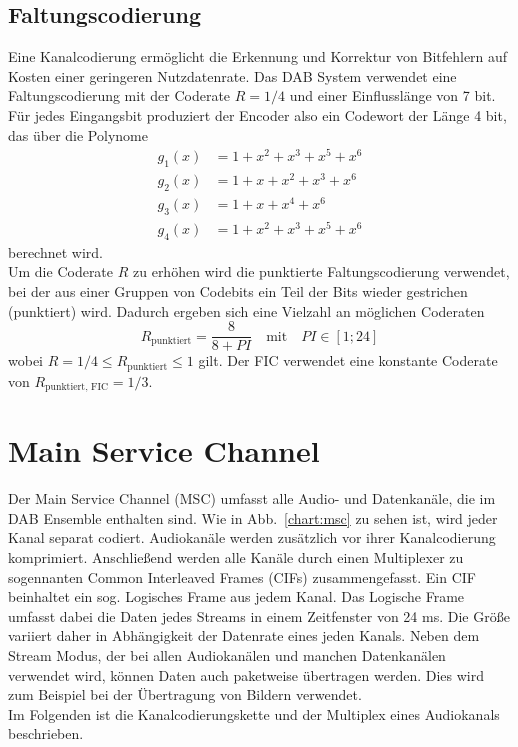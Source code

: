 \subsection{Faltungscodierung}
\label{sec:faltungscodierung}
Eine Kanalcodierung ermöglicht die Erkennung und Korrektur von Bitfehlern auf Kosten einer geringeren Nutzdatenrate. Das DAB System verwendet eine Faltungscodierung mit der Coderate $R=1/4$ und einer Einflusslänge von 7 bit. Für jedes Eingangsbit produziert der Encoder also ein Codewort der Länge 4 bit, das über die Polynome
\begin{equation}
\begin{aligned}
g_1(x) &= 1 + x^2 + x^3 + x^5 + x^6 \\
g_2(x) &= 1 + x + x^2 + x^3 + x^6 \\
g_3(x) &= 1 + x + x^4 + x^6 \\
g_4(x) &= 1 + x^2 + x^3 + x^5 + x^6
\end{aligned}
\end{equation}
berechnet wird. \\
Um die Coderate $R$ zu erhöhen wird die punktierte Faltungscodierung verwendet, bei der aus einer Gruppen von Codebits ein Teil der Bits wieder gestrichen (punktiert) wird. Dadurch ergeben sich eine Vielzahl an möglichen Coderaten
\begin{equation}
R_{\text{punktiert}} = \frac{8}{8 + PI} \quad \text{mit} \quad PI \in [1;24]
\end{equation}
wobei $R = 1/4 \leq R_{\text{punktiert}} \leq 1$ gilt. Der FIC verwendet eine konstante Coderate von $R_{\text{punktiert, FIC}} = 1/3$.

\section{Main Service Channel}
Der Main Service Channel (MSC) umfasst alle Audio- und Datenkanäle, die im DAB Ensemble enthalten sind. Wie in Abb.~\ref{chart:msc} zu sehen ist, wird jeder Kanal separat codiert. Audiokanäle werden zusätzlich vor ihrer Kanalcodierung komprimiert. Anschließend werden alle Kanäle durch einen Multiplexer zu sogennanten Common Interleaved Frames (CIFs) zusammengefasst. Ein CIF beinhaltet ein sog. Logisches Frame aus jedem Kanal. Das Logische Frame umfasst dabei die Daten jedes Streams in einem Zeitfenster von 24 ms. Die Größe variiert daher in Abhängigkeit der Datenrate eines jeden Kanals. Neben dem Stream Modus, der bei allen Audiokanälen und manchen Datenkanälen verwendet wird, können Daten auch paketweise übertragen werden. Dies wird zum Beispiel bei der Übertragung von Bildern verwendet.\\
Im Folgenden ist die Kanalcodierungskette und der Multiplex eines Audiokanals beschrieben.

